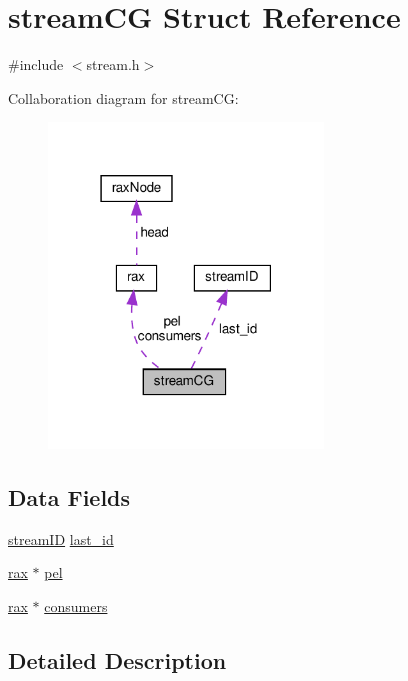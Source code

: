 \hypertarget{structstream_c_g}{}\section{stream\+CG Struct Reference}
\label{structstream_c_g}


{\ttfamily \#include $<$stream.\+h$>$}



Collaboration diagram for stream\+CG\+:
\nopagebreak
\begin{figure}[H]
\begin{center}
\leavevmode
\includegraphics[width=207pt]{structstream_c_g__coll__graph}
\end{center}
\end{figure}
\subsection*{Data Fields}
\begin{DoxyCompactItemize}
\item 
\hyperlink{structstream_i_d}{stream\+ID} \hyperlink{structstream_c_g_aaa32df2db581ba299a258cdc0db8e907}{last\+\_\+id}
\item 
\hyperlink{structrax}{rax} $\ast$ \hyperlink{structstream_c_g_a2fc8aed22096d11568cb29885cf08cb2}{pel}
\item 
\hyperlink{structrax}{rax} $\ast$ \hyperlink{structstream_c_g_a7773ab32d924c957c1db3ba8986cb963}{consumers}
\end{DoxyCompactItemize}


\subsection{Detailed Description}


